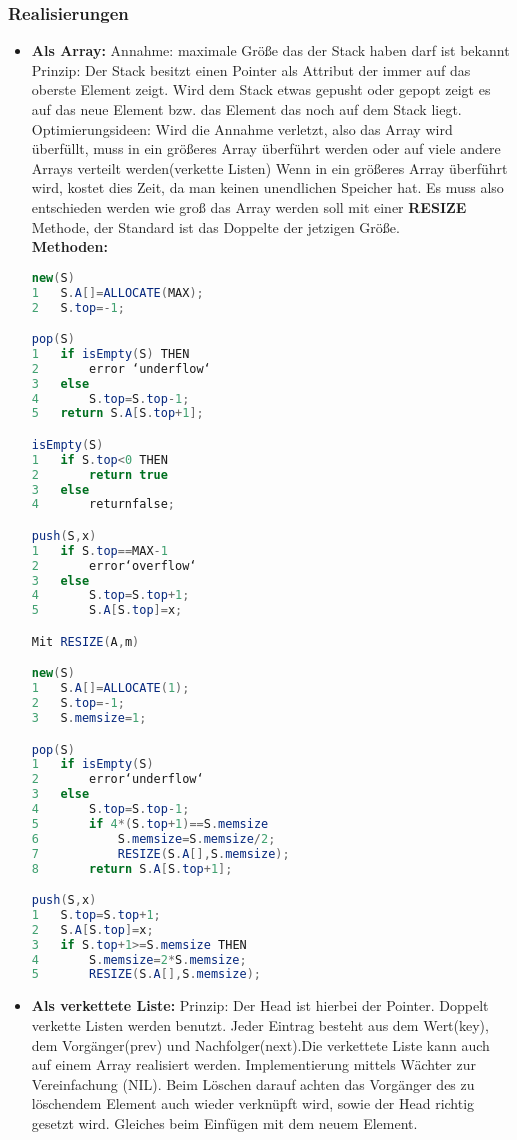 \documentclass[jou,apacite]{apa6}
\begin{document}
\subsubsection{Realisierungen}
\begin{itemize}
\item {\bfseries Als Array:}
Annahme: maximale Größe das der Stack haben darf ist bekannt
\\
Prinzip: Der Stack besitzt einen Pointer als Attribut der immer auf das oberste Element zeigt. Wird dem Stack etwas gepusht oder gepopt zeigt es auf das neue Element bzw. das Element das noch auf dem Stack liegt. 
\\
Optimierungsideen: Wird die Annahme verletzt, also das Array wird überfüllt, muss in ein größeres Array überführt werden oder auf viele andere Arrays verteilt werden(verkette Listen)
Wenn in ein größeres Array überführt wird, kostet dies Zeit, da man keinen unendlichen Speicher hat. Es muss also entschieden werden wie groß das Array werden soll mit einer {\bfseries RESIZE} Methode, der Standard ist das Doppelte der jetzigen Größe. \\
{\bfseries Methoden:} 
\begin{lstlisting}[language=java]
new(S)
1   S.A[]=ALLOCATE(MAX);
2   S.top=-1;

pop(S)
1   if isEmpty(S) THEN
2       error ‘underflow‘
3   else 
4       S.top=S.top-1;
5   return S.A[S.top+1];

isEmpty(S)
1   if S.top<0 THEN
2       return true
3   else 
4       returnfalse;

push(S,x)
1   if S.top==MAX-1  
2       error‘overflow‘
3   else 
4       S.top=S.top+1;
5       S.A[S.top]=x;

Mit RESIZE(A,m)

new(S)
1   S.A[]=ALLOCATE(1);
2   S.top=-1;
3   S.memsize=1;

pop(S)
1   if isEmpty(S) 
2       error‘underflow‘
3   else
4       S.top=S.top-1;
5       if 4*(S.top+1)==S.memsize 
6           S.memsize=S.memsize/2;
7           RESIZE(S.A[],S.memsize);
8       return S.A[S.top+1];

push(S,x)
1   S.top=S.top+1;
2   S.A[S.top]=x;
3   if S.top+1>=S.memsize THEN
4       S.memsize=2*S.memsize;
5       RESIZE(S.A[],S.memsize);
\end{lstlisting}
\item {\bfseries Als verkettete Liste:}
Prinzip: Der Head ist hierbei der Pointer. Doppelt verkette Listen werden benutzt. Jeder Eintrag besteht aus dem Wert(key), dem Vorgänger(prev) und Nachfolger(next).Die verkettete Liste kann auch auf einem Array realisiert werden. Implementierung mittels Wächter zur Vereinfachung (NIL). Beim Löschen darauf achten das Vorgänger des zu löschendem Element auch wieder verknüpft wird, sowie der Head richtig gesetzt wird. Gleiches beim Einfügen mit dem neuem Element.

\end{itemize}
\end{document}
